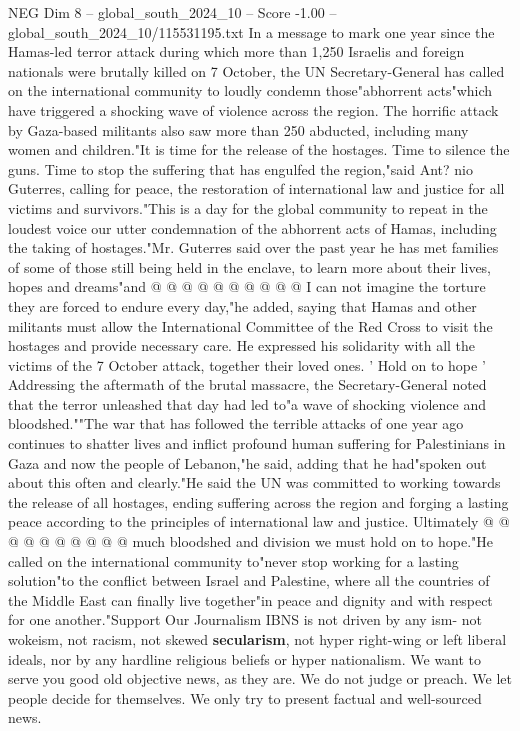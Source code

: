 \begin{textsample}{NEG Dim 8 – global\_south\_2024\_10 – Score -1.00 – global\_south\_2024\_10/115531195.txt}  \label{ex:f8_neg_196}
In a message to mark one year since the Hamas-led terror attack during which more than 1,250 Israelis and foreign nationals were brutally killed on 7 October, the UN Secretary-General has called on the international community to loudly condemn those"abhorrent acts"which have triggered a shocking wave of violence across the region.
The horrific attack by Gaza-based militants also saw more than 250 abducted, including many women and children."It is time for the release of the hostages.
Time to silence the guns.
Time to stop the suffering that has engulfed the region,"said Ant? nio Guterres, calling for peace, the restoration of international law and justice for all victims and survivors."This is a day for the global community to repeat in the loudest voice our utter condemnation of the abhorrent acts of Hamas, including the taking of hostages."Mr.
Guterres said over the past year he has met families of some of those still being held in the enclave, to learn more about their lives, hopes and dreams"and @ @ @ @ @ @ @ @ @ @ I can not imagine the torture they are forced to endure every day,"he added, saying that Hamas and other militants must allow the International Committee of the Red Cross to visit the hostages and provide necessary care.
He expressed his solidarity with all the victims of the 7 October attack, together their loved ones. ' Hold on to hope ' Addressing the aftermath of the brutal massacre, the Secretary-General noted that the terror unleashed that day had led to"a wave of shocking violence and bloodshed.""The war that has followed the terrible attacks of one year ago continues to shatter lives and inflict profound human suffering for Palestinians in Gaza and now the people of Lebanon,"he said, adding that he had"spoken out about this often and clearly."He said the UN was committed to working towards the release of all hostages, ending suffering across the region and forging a lasting peace according to the principles of international law and justice.
Ultimately @ @ @ @ @ @ @ @ @ @ much bloodshed and division we must hold on to hope."He called on the international community to"never stop working for a lasting solution"to the conflict between Israel and Palestine, where all the countries of the Middle East can finally live together"in peace and dignity and with respect for one another."Support Our Journalism IBNS is not driven by any ism- not wokeism, not racism, not skewed \textbf{secularism}, not hyper right-wing or left liberal ideals, nor by any hardline religious beliefs or hyper nationalism.
We want to serve you good old objective news, as they are.
We do not judge or preach.
We let people decide for themselves.
We only try to present factual and well-sourced news.

\end{textsample}
